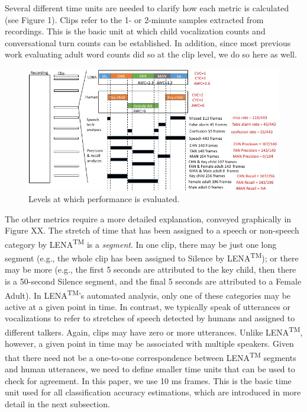 \documentclass[english,floatsintext,man]{apa6}
\begin{document}
Several different time units are needed to clarify how each metric is
calculated (see Figure 1). Clips refer to the 1- or 2-minute samples
extracted from recordings. This is the basic unit at which child
vocalization counts and conversational turn counts can be established.
In addition, since most previous work evaluating adult word counts did
so at the clip level, we do so here as well.

\begin{figure}
\centering
\includegraphics{fig_levels.jpg}
\caption{Levels at which performance is evaluated.}
\end{figure}

The other metrics require a more detailed explanation, conveyed
graphically in Figure XX. The stretch of time that has been assigned to
a speech or non-speech category by LENA\textsuperscript{TM} is a
\emph{segment}. In one clip, there may be just one long segment (e.g.,
the whole clip has been assigned to Silence by
LENA\textsuperscript{TM}); or there may be more (e.g., the first 5
seconds are attributed to the key child, then there is a 50-second
Silence segment, and the final 5 seconds are attributed to a Female
Adult). In LENA\textsuperscript{TM}'s automated analysis, only one of
these categories may be active at a given point in time. In contrast, we
typically speak of utterances or vocalizations to refer to stretches of
speech detected by humans and assigned to different talkers. Again,
clips may have zero or more utterances. Unlike LENA\textsuperscript{TM},
however, a given point in time may be associated with multiple speakers.
Given that there need not be a one-to-one correspondence between
LENA\textsuperscript{TM} segments and human utterances, we need to
define smaller time units that can be used to check for agreement. In
this paper, we use 10 ms frames. This is the basic time unit used for
all classification accuracy estimations, which are introduced in more
detail in the next subsection.
\end{document}
